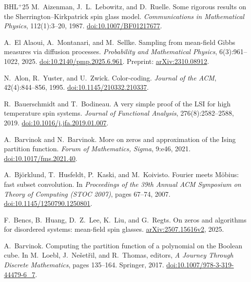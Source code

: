 \documentclass[10pt]{article}
\theoremstyle{plain}
\theoremstyle{definition}
\theoremstyle{remark}
\begin{document}
\begin{thebibliography}{BHL$^+$25}
M.~Aizenman, J.~L.~Lebowitz, and D.~Ruelle.
\newblock Some rigorous results on the Sherrington--Kirkpatrick spin glass model.
\newblock \emph{Communications in Mathematical Physics}, 112(1):3--20, 1987.
\newblock \href{https://doi.org/10.1007/BF01217677}{doi:10.1007/BF01217677}.

A.~El Alaoui, A.~Montanari, and M.~Sellke.
\newblock Sampling from mean-field Gibbs measures via diffusion processes.
\newblock \emph{Probability and Mathematical Physics}, 6(3):961--1022, 2025.
\newblock \href{https://doi.org/10.2140/pmp.2025.6.961}{doi:10.2140/pmp.2025.6.961}.
\newblock Preprint: \href{https://arxiv.org/abs/2310.08912}{arXiv:2310.08912}.

N.~Alon, R.~Yuster, and U.~Zwick.
\newblock Color-coding.
\newblock \emph{Journal of the ACM}, 42(4):844--856, 1995.
\newblock \href{https://doi.org/10.1145/210332.210337}{doi:10.1145/210332.210337}.

R.~Bauerschmidt and T.~Bodineau.
\newblock A very simple proof of the LSI for high temperature spin systems.
\newblock \emph{Journal of Functional Analysis}, 276(8):2582--2588, 2019.
\newblock \href{https://doi.org/10.1016/j.jfa.2019.01.007}{doi:10.1016/j.jfa.2019.01.007}.

A.~Barvinok and N.~Barvinok.
\newblock More on zeros and approximation of the Ising partition function.
\newblock \emph{Forum of Mathematics, Sigma}, 9:e46, 2021.
\newblock \href{https://doi.org/10.1017/fms.2021.40}{doi:10.1017/fms.2021.40}.

A.~Bj\"orklund, T.~Husfeldt, P.~Kaski, and M.~Koivisto.
\newblock Fourier meets M\"obius: fast subset convolution.
\newblock In \emph{Proceedings of the 39th Annual ACM Symposium on Theory of Computing (STOC 2007)}, pages 67--74, 2007.
\newblock \href{https://doi.org/10.1145/1250790.1250801}{doi:10.1145/1250790.1250801}.

F.~Bencs, B.~Huang, D.~Z.~Lee, K.~Liu, and G.~Regts.
\newblock On zeros and algorithms for disordered systems: mean-field spin glasses.
\newblock \href{https://arxiv.org/abs/2507.15616v2}{arXiv:2507.15616v2}, 2025.

A.~Barvinok.
\newblock Computing the partition function of a polynomial on the Boolean cube.
\newblock In M.~Loebl, J.~Ne\v{s}et\v{r}il, and R.~Thomas, editors, \emph{A Journey Through Discrete Mathematics}, pages 135--164. Springer, 2017.
\newblock \href{https://doi.org/10.1007/978-3-319-44479-6_7}{doi:10.1007/978-3-319-44479-6\_7}.


\end{thebibliography}
\end{document}
